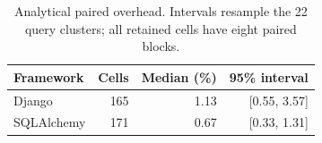 \begin{table}[!t]
\caption{Analytical paired overhead. Intervals resample the 22 query clusters; all retained cells have eight paired blocks.}\label{tab:headline}
\centering\small\renewcommand{\arraystretch}{1.15}
\begin{tabular}{lrrr}\toprule
Framework & Cells & Median (\%) & 95\% interval \\\midrule
Django & 165 & 1.13 & [0.55, 3.57] \\
SQLAlchemy & 171 & 0.67 & [0.33, 1.31] \\
\bottomrule\end{tabular}\end{table}
